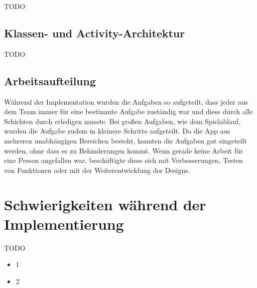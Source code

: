 TODO

\subsection{Klassen- und Activity-Architektur}
\label{sec:implementierung:architektur:klassenmodell}

TODO

\subsection{Arbeitsaufteilung}
\label{sec:implementierung:architektur:arbeitsaufteilung}

Während der Implementation wurden die Aufgaben so aufgeteilt, dass jeder aus dem Team immer für eine bestimmte Aufgabe zuständig war und diese durch alle Schichten durch erledigen musste. Bei großen Aufgaben, wie dem Spielablauf, wurden die Aufgabe zudem in kleinere Schritte aufgeteilt. Da die App aus mehreren unabhängigen Bereichen besteht, konnten die Aufgaben gut eingeteilt werden, ohne dass es zu Behinderungen kommt. Wenn gerade keine Arbeit für eine Person angefallen war, beschäftigte diese sich mit Verbesserungen, Testen von Funktionen oder mit der Weiterentwicklung des Designs.

\section{Schwierigkeiten während der Implementierung}
\label{sec:implementierung:schwierigkeiten}	

TODO

\begin{itemize} 
\item 1
\item 2
\end{itemize}